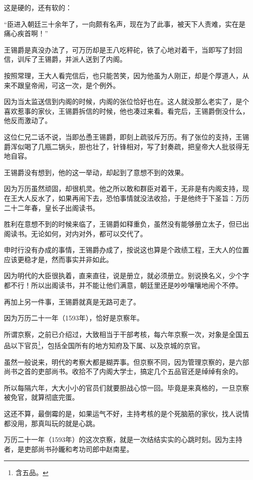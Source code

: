 \begin{multicols}{\theparacolNo}
		这是硬的，还有软的：

		“臣进入朝廷三十余年了，一向颇有名声，现在为了此事，被天下人责难，实在是痛心疾首啊！”

		王锡爵是真没办法了，可万历却是王八吃秤砣，铁了心地对着干，当即写了封回信，训斥了王锡爵，并派人送到了内阁。

		按照常理，王大人看完信后，也只能苦笑，因为他虽为人刚正，却是个厚道人，从来不跟皇帝闹，可这一次，是个例外。

		因为当太监送信到内阁的时候，内阁的张位恰好也在。这人就没那么老实了，是个喜欢惹事的家伙，王锡爵拆信的时候，他也凑过来看。看完后，王锡爵倒没什么，他反而激动了。

		这位仁兄二话不说，当即怂恿王锡爵，即刻上疏驳斥万历。有了张位的支持，王锡爵浑似喝了几瓶二锅头，胆也壮了，针锋相对，写了封奏疏，把皇帝大人批驳得无地自容。

		王锡爵没有想到，他的这一举动，却起到了意想不到的效果。

		因为万历虽然顽固，却很机灵。他之所以敢和群臣对着干，无非是有内阁支持，现在王大人反水了，如果再闹下去，恐怕事情就没法收拾，于是他终于下圣旨：万历二十二年春，皇长子出阁读书。

		胜利在意想不到的时候来临了，王锡爵如释重负，虽然没有能够册立太子，但已出阁读书。无论如何，对内对外，都可以交代了。

		申时行没有办成的事情，王锡爵办成了，按说这也算是个政绩工程，王大人的位置应该更稳才是，然而事实并非如此。

		因为明代的大臣很执着，直来直往，说是册立，就必须册立。别说换名义，少个字都不行！所以出阁读书，并不能让他们满意，朝廷里还是吵吵嚷嚷地闹个不停。

		再加上另一件事，王锡爵就真是无路可走了。

		因为万历二十一年（1593年），恰好是京察年。

		所谓京察，之前已介绍过，大致相当于干部考核，每六年京察一次，对象是全国五品以下官员\footnote{含五品。}，包括全国所有的地方知府及下属、以及京城的京官。

		虽然一般说来，明代的考察大都是糊弄事。但京察不同，因为管理京察的，是六部尚书之首的吏部尚书。收拾不了内阁大学士，搞定几个五品官还是绰绰有余的。

		所以每隔六年，大大小小的官员们就要胆战心惊一回。毕竟是来真格的，一旦京察被免官，就算彻底完蛋。

		这还不算，最倒霉的是，如果运气不好，主持考核的是个死脑筋的家伙，找人说情都没用，那真叫玩的就是心跳。

		万历二十一年（1593年）的这次京察，就是一次结结实实的心跳时刻。因为主持者，是吏部尚书孙鑨和考功司郎中赵南星。


\end{multicols}
